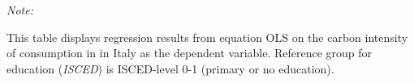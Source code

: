 \begin{table}[htbp!]
\begin{adjustbox}{width = 1\textwidth, max height = 0.95\textheight, center}
\begin{threeparttable}[b]
         \begin{tablenotes}\item \medskip \textit{Note:}
            \item This table displays regression results from equation OLS on the carbon intensity of consumption in  in Italy as the dependent variable. Reference group for education (\textit{ISCED}) is ISCED-level 0-1 (primary or no education).
         \end{tablenotes}
      \end{threeparttable}
   \end{adjustbox}
\end{table}


